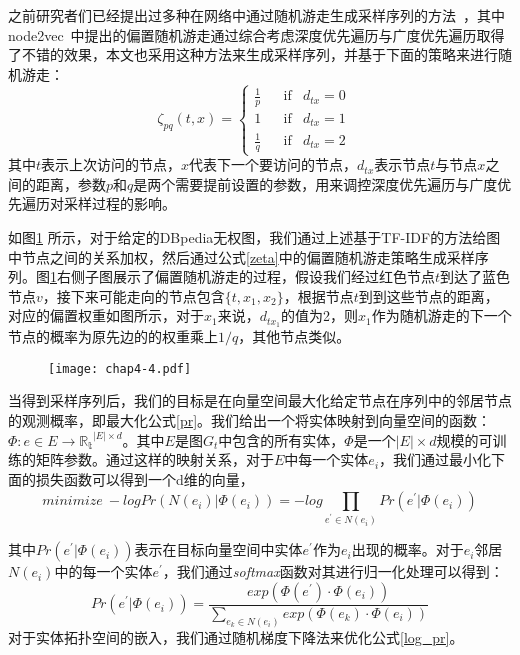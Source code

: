 \noindent 之前研究者们已经提出过多种在网络中通过随机游走生成采样序列的方法~\cite{kdd/Perozzi14, kdd/GroverL16}，其中node2vec~\cite{kdd/GroverL16}中提出的偏置随机游走通过综合考虑深度优先遍历与广度优先遍历取得了不错的效果，本文也采用这种方法来生成采样序列，并基于下面的策略来进行随机游走：
\begin{equation}
    \label{zeta}
    \zeta_{pq}(t,x) = \left\{\begin{matrix}
        \frac{1}{p} && \text{if} & d_{tx} = 0 & \\
        1           && \text{if} & d_{tx} = 1 & \\
        \frac{1}{q} && \text{if} & d_{tx} = 2 & 
        \end{matrix}\right.
\end{equation} 
\noindent 其中$t$表示上次访问的节点，$x$代表下一个要访问的节点，$d_{tx}$表示节点$t$与节点$x$之间的距离，参数$p$和$q$是两个需要提前设置的参数，用来调控深度优先遍历与广度优先遍历对采样过程的影响。

如图\ref{chap4-4} 所示，对于给定的DBpedia无权图，我们通过上述基于TF-IDF的方法给图中节点之间的关系加权，然后通过公式\ref{zeta}中的偏置随机游走策略生成采样序列。图\ref{chap4-4}右侧子图展示了偏置随机游走的过程，假设我们经过红色节点$t$到达了蓝色节点$v$，接下来可能走向的节点包含$\{t, x_1, x_2\}$，根据节点$t$到到这些节点的距离，对应的偏置权重如图所示，对于$x_1$来说，$d_{tx_1}$的值为2，则$x_1$作为随机游走的下一个节点的概率为原先边的的权重乘上$1/q$，其他节点类似。

\begin{figure}[!ht]
    \centerline{\texttt{[image: chap4-4.pdf]}}
    \label{chap4-4}
\end{figure}

当得到采样序列后，我们的目标是在向量空间最大化给定节点在序列中的邻居节点的观测概率，即最大化公式\ref{pr}。我们给出一个将实体映射到向量空间的函数：$\Phi: e \in E \rightarrow \mathbb{R_t}^{\left | E \right | \times d}$。其中$E$是图$G_t$中包含的所有实体，$\Phi$是一个$\left | E \right | \times d$规模的可训练的矩阵参数。通过这样的映射关系，对于$E$中每一个实体$e_i$，我们通过最小化下面的损失函数可以得到一个d维的向量，
\begin{equation}
    \label{log_pr}
    minimize\ -log Pr(N(e_i)|\Phi(e_i)) = -log\prod_{e^{'} \in N(e_i)}^{ }Pr(e^{'}|\Phi(e_i))
\end{equation}

\noindent 其中$Pr(e^{'}|\Phi(e_i))$表示在目标向量空间中实体$e^{'}$作为$e_i$出现的概率。对于$e_i$邻居$N(e_i)$中的每一个实体$e^{'}$，我们通过\emph{softmax}函数对其进行归一化处理可以得到：
\begin{equation}
    Pr(e^{'}|\Phi(e_i)) = \frac{exp(\Phi(e^{'})\cdot \Phi(e_i))}{\sum_{e_k \in N(e_i)}^{ }exp(\Phi(e_k)\cdot \Phi(e_i))}
\end{equation}
\noindent 对于实体拓扑空间的嵌入，我们通过随机梯度下降法来优化公式\ref{log_pr}。

